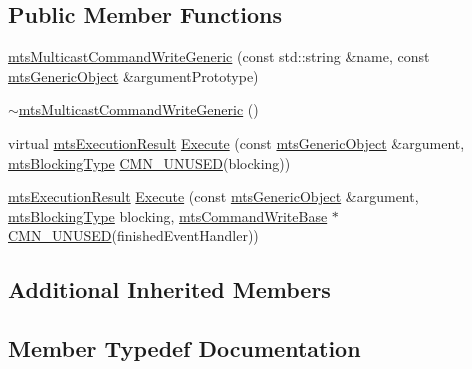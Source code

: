 \subsection*{Public Member Functions}
\begin{DoxyCompactItemize}
\item 
\hyperlink{classmts_multicast_command_write_generic_a0dfaa78a4f3b696f30c16a9c91621a56}{mts\+Multicast\+Command\+Write\+Generic} (const std\+::string \&name, const \hyperlink{classmts_generic_object}{mts\+Generic\+Object} \&argument\+Prototype)
\item 
\hyperlink{classmts_multicast_command_write_generic_a57c99817ece859e07be08243dff7f70e}{$\sim$mts\+Multicast\+Command\+Write\+Generic} ()
\item 
virtual \hyperlink{classmts_execution_result}{mts\+Execution\+Result} \hyperlink{classmts_multicast_command_write_generic_adef62d44a0e2fc7c05d92d67356b25ab}{Execute} (const \hyperlink{classmts_generic_object}{mts\+Generic\+Object} \&argument, \hyperlink{mts_forward_declarations_8h_ad7426ccb6c883bc780d0ee197dddcbe7}{mts\+Blocking\+Type} \hyperlink{cmn_portability_8h_a021894e2626935fa2305434b1e893ff6}{C\+M\+N\+\_\+\+U\+N\+U\+S\+E\+D}(blocking))
\item 
\hyperlink{classmts_execution_result}{mts\+Execution\+Result} \hyperlink{classmts_multicast_command_write_generic_ac0d9b6b578959511ddc197c38b3d05e4}{Execute} (const \hyperlink{classmts_generic_object}{mts\+Generic\+Object} \&argument, \hyperlink{mts_forward_declarations_8h_ad7426ccb6c883bc780d0ee197dddcbe7}{mts\+Blocking\+Type} blocking, \hyperlink{classmts_command_write_base}{mts\+Command\+Write\+Base} $\ast$\hyperlink{cmn_portability_8h_a021894e2626935fa2305434b1e893ff6}{C\+M\+N\+\_\+\+U\+N\+U\+S\+E\+D}(finished\+Event\+Handler))
\end{DoxyCompactItemize}
\subsection*{Additional Inherited Members}


\subsection{Member Typedef Documentation}
\hypertarget{classmts_multicast_command_write_generic_ad9b380aee1bd7519d91697092a045bf9}{}
